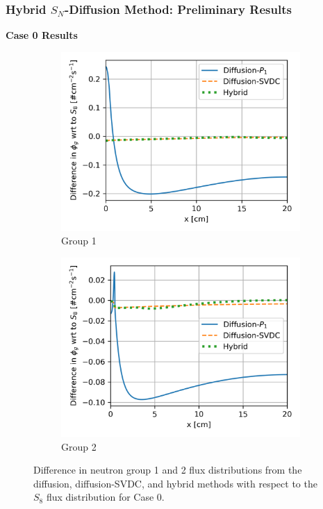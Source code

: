 \begin{frame}
  \frametitle{Hybrid $S_N$-Diffusion Method: Preliminary Results}
  \textbf{Case 0 Results}
  \begin{figure}
    \centering
    \begin{subfigure}[b]{.49\textwidth}
      \centering
      \includegraphics[width=\textwidth]{../images/case-0-group-1-hybrid-flux-diff}
      \caption{Group 1}
      \label{fig:c0g1hfdiff}
    \end{subfigure}
    \hfill
    \begin{subfigure}[b]{.49\textwidth}
      \centering
      \includegraphics[width=\textwidth]{../images/case-0-group-2-hybrid-flux-diff}
      \caption{Group 2}
      \label{fig:c0g2hfdiff}
    \end{subfigure}
    \caption{Difference in neutron group 1 and 2 flux distributions from the diffusion,
    diffusion-\gls{SVDC}, and hybrid methods with respect to the $S_8$ flux distribution for Case 0.}
    \label{fig:c0hfdiff}
  \end{figure}
\end{frame}

